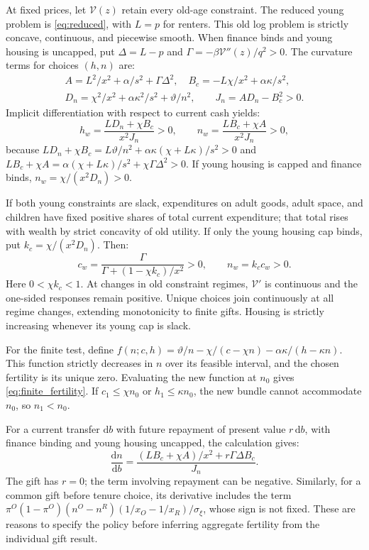 \documentclass[11pt]{article}
\newcommand{\dd}{\mathrm d}
\begin{document}
At fixed prices, let $\mathcal V(z)$ retain every old-age constraint. The
reduced young problem is \eqref{eq:reduced}, with $L=p$ for renters. This
old log problem is strictly concave, continuous, and piecewise smooth.
When finance binds and young housing is uncapped, put $\Delta=L-p$ and
$\Gamma=-\beta\mathcal V''(z)/q^2>0$. The curvature terms for choices
$(h,n)$ are:
\begin{equation}
\begin{gathered}
A=L^2/x^2+\alpha/s^2+\Gamma\Delta^2,\quad
B_c=-L\chi/x^2+\alpha\kappa/s^2,\\
D_n=\chi^2/x^2+\alpha\kappa^2/s^2+\vartheta/n^2,
\qquad J_n=AD_n-B_c^2>0.
\end{gathered}
\end{equation}
Implicit differentiation with respect to current cash yields:
\begin{equation}
h_w=\frac{LD_n+\chi B_c}{x^2J_n}>0,
\qquad n_w=\frac{LB_c+\chi A}{x^2J_n}>0,
\end{equation}
because
$LD_n+\chi B_c=L\vartheta/n^2+\alpha\kappa(\chi+L\kappa)/s^2>0$
and $LB_c+\chi A=\alpha(\chi+L\kappa)/s^2+\chi\Gamma\Delta^2>0$.
If young housing is capped and finance binds,
$n_w=\chi/(x^2D_n)>0$.

If both young constraints are slack, expenditures on adult goods, adult
space, and children have fixed positive shares of total current expenditure;
that total rises with wealth by strict concavity of old utility. If only the
young housing cap binds, put $k_c=\chi/(x^2D_n)$. Then:
\begin{equation}
c_w=\frac\Gamma{\Gamma+(1-\chi k_c)/x^2}>0,
\qquad n_w=k_c c_w>0.
\end{equation}
Here $0<\chi k_c<1$. At changes in old constraint regimes, $\mathcal V'$
is continuous and the one-sided responses remain positive. Unique choices
join continuously at all regime changes, extending monotonicity to finite
gifts. Housing is strictly increasing whenever its young cap is slack.

For the finite test, define
$f(n;c,h)=\vartheta/n-\chi/(c-\chi n)-\alpha\kappa/(h-\kappa n)$.
This function strictly decreases in $n$ over its feasible interval, and the
chosen fertility is its unique zero. Evaluating the new function at $n_0$
gives \eqref{eq:finite_fertility}. If $c_1\le\chi n_0$ or
$h_1\le\kappa n_0$, the new bundle cannot accommodate $n_0$, so $n_1<n_0$.

For a current transfer $\dd b$ with future repayment of present value
$r\,\dd b$, with finance binding and young housing uncapped, the calculation gives:
\begin{equation}
\frac{\dd n}{\dd b}=
\frac{(LB_c+\chi A)/x^2+r\Gamma\Delta B_c}{J_n}.
\end{equation}
The gift has $r=0$; the term involving repayment can be negative. Similarly,
for a common gift before tenure choice, its derivative includes the term
$\pi^O(1-\pi^O)(n^O-n^R)(1/x_O-1/x_R)/\sigma_\xi$, whose sign is not
fixed. These are reasons to specify the policy before inferring aggregate
fertility from the individual gift result.
\end{document}
